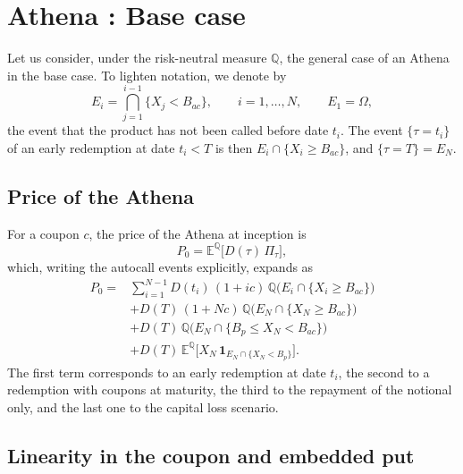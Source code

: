 \documentclass[11pt,a4paper]{article}
\newcommand{\ind}{\mathbf{1}}
\begin{document}
\clearpage
\section{Athena : Base case}\label{sec:athena}


Let us consider, under the risk-neutral measure $\mathbb{Q}$, the general
case of an Athena in the base case. To lighten notation, we denote by
\begin{equation}
  E_i = \bigcap_{j=1}^{i-1} \{X_j < B_{ac}\}, \qquad i = 1, \dots, N,
  \qquad E_1 = \Omega,
\end{equation}
the event that the product has not been called before date $t_i$. The
event $\{\tau = t_i\}$ of an early redemption at date $t_i < T$ is then
$E_i \cap \{X_i \geq B_{ac}\}$, and $\{\tau = T\} = E_N$.

\subsection{Price of the Athena}

For a coupon $c$, the price of the Athena at inception is
\begin{equation}
  P_0 = \mathbb{E}^{\mathbb{Q}}\bigl[ D(\tau)\, \Pi_\tau \bigr],
\end{equation}
which, writing the autocall events explicitly, expands as
\begin{align}
  P_0 = {}& \sum_{i=1}^{N-1} D(t_i)\,(1 + i c)\,
          \mathbb{Q}\bigl( E_i \cap \{X_i \geq B_{ac}\} \bigr) \nonumber \\
        & + D(T)\,(1 + N c)\,
          \mathbb{Q}\bigl( E_N \cap \{X_N \geq B_{ac}\} \bigr) \nonumber \\
        & + D(T)\,
          \mathbb{Q}\bigl( E_N \cap \{B_p \leq X_N < B_{ac}\} \bigr) \nonumber \\
        & + D(T)\,
          \mathbb{E}^{\mathbb{Q}}\bigl[ X_N \, \ind_{E_N \cap \{X_N < B_p\}} \bigr].
  \label{eq:athena-price-explicit}
\end{align}
The first term corresponds to an early redemption at date $t_i$, the
second to a redemption with coupons at maturity, the third to the
repayment of the notional only, and the last one to the capital loss
scenario.

\subsection{Linearity in the coupon and embedded put}
\end{document}
